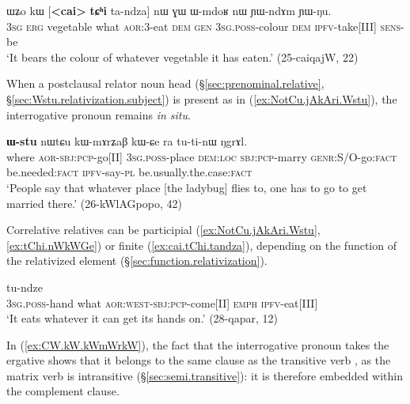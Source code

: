 \begin{exe}
\ex \label{ex:cai.tChi.tandza}
\gll ɯʑo kɯ [\textbf{<cai>} \textbf{tɕʰi} ta-ndza] nɯ ɣɯ ɯ-mdoʁ nɯ ɲɯ-ndɤm ɲɯ-ŋu. \\
\textsc{3sg} \textsc{erg} vegetable what \textsc{aor}:3\flobv{}-eat \textsc{dem} \textsc{gen} \textsc{3sg}.\textsc{poss}-colour \textsc{dem} \textsc{ipfv}-take[III] \textsc{sens}-be \\
\glt  `It bears the colour of whatever vegetable it has eaten.' (25-caiqajW, 22)
\end{exe}

When a postclausal relator noun head (§\ref{sec:prenominal.relative}, §\ref{sec:Wstu.relativization.subject}) is present as in (\ref{ex:NotCu.jAkAri.Wstu}), the interrogative pronoun remains \textit{in situ}.

\begin{exe}
\ex \label{ex:NotCu.jAkAri.Wstu}
 \textbf{ɯ-stu} nɯtɕu kɯ-mɤrʑaβ kɯ-ɕe ra tu-ti-nɯ ŋgrɤl. \\
where \textsc{aor}-\textsc{sbj}:\textsc{pcp}-go[II] \textsc{3sg}.\textsc{poss}-place \textsc{dem}:\textsc{loc} \textsc{sbj}:\textsc{pcp}-marry \textsc{genr}:S/O-go:\textsc{fact} be.needed:\textsc{fact} \textsc{ipfv}-say-\textsc{pl} be.usually.the.case:\textsc{fact} \\
\glt `People say that whatever place [the ladybug] flies to, one has to go to get married there.' (26-kWlAGpopo, 42)
\end{exe}

Correlative relatives can be participial (\ref{ex:NotCu.jAkAri.Wstu}, \ref{ex:tChi.nWkWGe}) or finite (\ref{ex:cai.tChi.tandza}), depending on the function of the relativized element (§\ref{sec:function.relativization}).

\begin{exe}
\ex \label{ex:tChi.nWkWGe}
 tu-ndze \\
\textsc{3sg}.\textsc{poss}-hand what \textsc{aor}:\textsc{west}-\textsc{sbj}:\textsc{pcp}-come[II] \textsc{emph} \textsc{ipfv}-eat[III] \\
\glt `It eats whatever it can get its hands on.' (28-qapar, 12)
\end{exe}


 In (\ref{ex:CW.kW.kWmWrkW}), the fact that the interrogative pronoun  takes the ergative shows that it belongs to the same clause as the transitive verb , as the matrix verb  is intransitive (§\ref{sec:semi.transitive}): it is therefore embedded within the complement clause.

